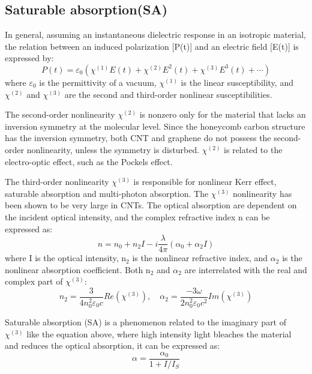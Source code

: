 \documentclass{phyasgn}\usepackage{nag}
\begin{document}
\subsection{Saturable absorption(SA)}
In general, assuming an instantaneous dielectric response in an isotropic material, the relation between an induced polarization [P(t)] and an electric field [E(t)] is expressed by:
\begin{equation}
P(t)=\varepsilon_0(\chi^{(1)}E(t)+\chi^{(2)}E^{2}(t)+\chi^{(3)}E^{3}(t)+\cdots )
\end{equation}
where $\varepsilon_0$ is the permittivity of a vacuum, $\chi^{(1)}$ is the linear susceptibility, and $\chi^{(2)}$ and $\chi^{(3)}$ are the second and third-order nonlinear susceptibilities.
\par The second-order nonlinearity $\chi^{(2)}$ is nonzero only for the material that lacks an inversion symmetry at the molecular level. Since the honeycomb carbon structure has the inversion symmetry, both CNT and graphene do not possess the second-order nonlinearity, unless the symmetry is disturbed. $\chi^{(2)}$ is related to the electro-optic effect, such as the Pockels effect.
\par The third-order nonlinearity $\chi^{(3)}$ is responsible for nonlinear Kerr effect, saturable absorption and multi-photon absorption. The $\chi^{(3)}$ nonlinearity has been shown to be very large in CNTs. The optical absorption are dependent on the incident optical intensity, and the complex refractive index n can be expressed as:
\begin{equation}
n=n_0+n_2I-i\dfrac{\lambda}{4\pi}(\alpha_0+\alpha_2I)
\end{equation}
where I is the optical intensity, n$_2$ is the nonlinear refractive index, and $\alpha_2$ is the nonlinear absorption coefficient. Both n$_2$ and $\alpha_2$ are interrelated with the real and complex part of $\chi^{(3)}$:
\begin{equation}
n_2=\dfrac{3}{4n_0^2\varepsilon_0c}Re(\chi^{(3)}),\quad \alpha_2=\dfrac{-3\omega}{2n_0^2\varepsilon_0c^2}Im(\chi^{(3)})
\end{equation}
\par Saturable absorption (SA) is a phenomenon related to the imaginary part of $\chi^{(3)}$ like the equation above, where high intensity light bleaches the material and reduces the optical absorption, it can be expressed as:
\begin{equation}
\alpha=\dfrac{\alpha_0}{1+I/I_S}
\end{equation}
\end{document}
